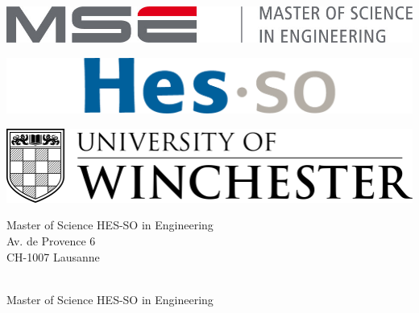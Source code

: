 
\begin{titlepage}
{\selectfont
	\begin{flushright}
		\begin{minipage}{0.33\textwidth}
			\begin{flushleft}
				\includegraphics[width=1\textwidth]{img/mse_logo}
			\end{flushleft}
		\end{minipage}%
		\begin{minipage}{0.34\textwidth}
			\begin{center}
				\includegraphics[width=1\textwidth]{img/hesso_logo.png}
			\end{center}
		\end{minipage}%
		\begin{minipage}{0.33\textwidth}
			\begin{flushright}
				\includegraphics[width=1\textwidth]{img/winchester_logo}
			\end{flushright}
		\end{minipage}
		\begin{flushleft}
			\footnotesize
			Master of Science HES-SO in Engineering \\
			Av. de Provence 6 \\
			CH-1007 Lausanne
		\end{flushleft}
		~\\[1cm]
		
		{
		\Huge Master of Science HES-SO in Engineering\\[0.5cm]
		}
		

\end{flushright}}
\end{titlepage}
